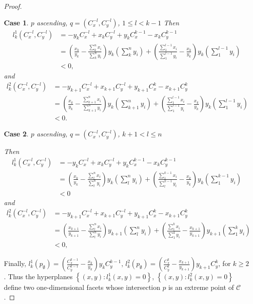 \documentclass{article}
\theoremstyle{case}
\newtheorem{case}{Case}
\begin{document}
\begin{proof}
%
%
\begin{case} $p$ ascending, $q = \left( C_x^{-l}, C_y^{-l}\right)$, $1 \leq l < k-1$
\noindent Then 
\begin{align*}
l_k^1\left( C_x^{-l}, C_y^{-l}\right) &= -y_kC_x^{-l} + x_kC_{y}^{-l} + y_kC_x^{k-1} - x_kC_y^{k-1} \\
&=\left( \frac{x_k}{y_k} - \frac{\sum_k^nx_i}{\sum_k^ny_i}\right)y_k\left(\sum_k^n y_i\right)  + \left( \frac{\sum_1^{l-1}x_i}{\sum_1^{l-1}y_i} - \frac{x_k}{y_k}\right)y_k\left(\sum_1^{l-1}y_i\right) \\
&< 0,
\end{align*}
and
\begin{align*}
l_k^2\left( C_x^{-l}, C_y^{-l}\right) &= -y_{k+1}C_x^{-l} + x_{k+1}C_y^{-l} + y_{k+1}C_x^k - x_{k+1}C_y^k \\
&= \left( \frac{x_k}{y_k} - \frac{\sum_{k+1}^nx_i}{\sum_{k+1}^ny_i}\right)y_k\left( \sum_{k+1}^n y_i\right) + \left( \frac{\sum_1^{l-1}x_i}{\sum_1^{l-1}y_i} - \frac{x_k}{y_k}\right)y_k\left( \sum_1^{l-1}y_i\right) \\
&< 0.
\end{align*}
\end{case}

%
%
\begin{case} $p$ ascending, $q = \left( C_x^{-l}, C_y^{-l}\right)$, $k+1 < l \leq n$

\noindent Then
\begin{align*}
l_k^1\left( C_x^{-l}, C_y^{-l}\right) &= -y_kC_x^{-l} + x_kC_{y}^{-l} + y_kC_x^{k-1} - x_kC_y^{k-1} \\
&= \left( \frac{x_k}{y_k} - \frac{\sum_l^n x_i}{\sum_l^n y_i}\right)y_k \left( \sum_l^n y_i\right) + \left( \frac{\sum_1^{k-1} x_i}{\sum_l^{k-1}y_i} - \frac{x_k}{y_k}\right)y_k \left( \sum_1^{k-1}y_i\right) \\
&< 0
\end{align*}
and
\begin{align*}
l_k^2\left( C_x^{-l}, C_y^{-l}\right) &= -y_{k+1}C_x^{-l} + x_{k+1}C_y^{-l} + y_{k+1}C_x^k - x_{k+1}C_y^k \\
&= \left( \frac{x_{k+1}}{y_{k+1}} - \frac{\sum_l^n x_i}{\sum_l^n y_i}\right)y_{k+1}\left(\sum_l^n y_i\right) + \left( \frac{\sum_1^k x_i}{\sum_1^k y_i} - \frac{x_{k+1}}{y_{k+1}}\right)y_{k+1}\left(\sum_1^k y_i\right) \\
&< 0,
\end{align*}
\end{case}

\noindent Finally, $l_k^1\left( p_{\emptyset}\right) = (\frac{C_x^{k-1}}{C_y^{k-1}} - \frac{x_k}{y_k})y_kC_y^{k-1}$, $l_k^2\left( p_{\emptyset}\right) = (\frac{C_x^k}{C_y^k} - \frac{x_{k+1}}{y_{k+1}})y_{k+1}C_y^k$, for $k \geq 2$. Thus the hyperplanes $\left\lbrace \left( x,y\right) \colon l_k^1\left( x,y\right) = 0\right\rbrace$, $\left\lbrace \left( x,y\right) \colon l_k^2\left( x,y\right) = 0\right\rbrace$ define two one-dimensional facets whose intersection $p$ is an extreme point of $\mathcal{C}$.


\end{proof}
\end{document}
